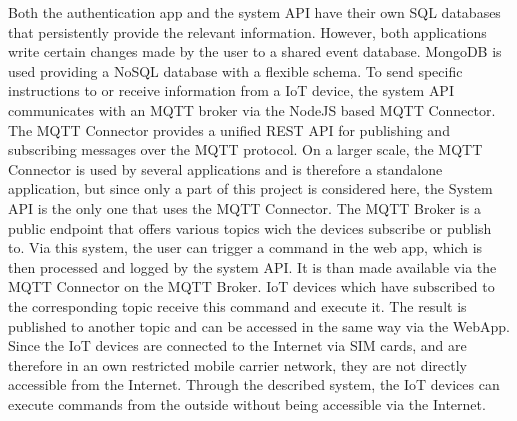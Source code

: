 \documentclass[12pt, a4paper]{article}
\begin{document}
        Both the authentication app and the system \ac{API} have their own SQL databases that persistently provide the relevant information. However, both applications write certain changes made by the user to a shared event database. MongoDB is used providing a NoSQL database with a flexible schema. To send specific instructions to or receive information from a \ac{IoT} device, the system \ac{API} communicates with an MQTT broker via the NodeJS based MQTT Connector. The MQTT Connector provides a unified \ac{REST} \ac{API} for publishing and subscribing messages over the MQTT protocol. On a larger scale, the MQTT Connector is used by several applications and is therefore a standalone application, but since only a part of this project is considered here, the System API is the only one that uses the MQTT Connector. The MQTT Broker is a public endpoint that offers various topics wich the devices subscribe or publish to. Via this system, the user can trigger a command in the web app, which is then processed and logged by the system \ac{API}. It is than made available via the MQTT Connector on the MQTT Broker. IoT devices which have subscribed to the corresponding topic receive this command and execute it. The result is published to another topic and can be accessed in the same way via the WebApp. Since the IoT devices are connected to the Internet via SIM cards, and are therefore in an own restricted mobile carrier network, they are not directly accessible from the Internet. Through the described system, the IoT devices can execute commands from the outside without being accessible via the Internet.
\end{document}
